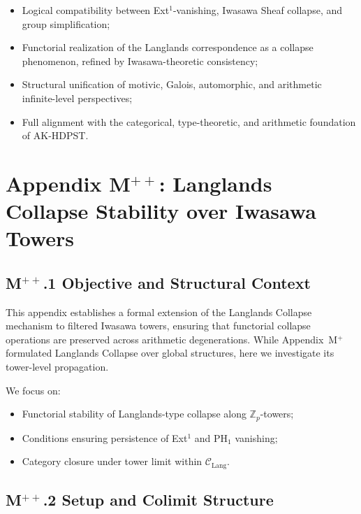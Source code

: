 \documentclass[11pt]{article}
\begin{document}
\begin{itemize}
    \item Logical compatibility between Ext$^1$-vanishing, Iwasawa Sheaf collapse, and group simplification;
    \item Functorial realization of the Langlands correspondence as a collapse phenomenon, refined by Iwasawa-theoretic consistency;
    \item Structural unification of motivic, Galois, automorphic, and arithmetic infinite-level perspectives;
    \item Full alignment with the categorical, type-theoretic, and arithmetic foundation of AK-HDPST.
\end{itemize}




\section*{Appendix M$^{++}$: Langlands Collapse Stability over Iwasawa Towers}

\subsection*{M$^{++}$.1 Objective and Structural Context}

This appendix establishes a formal extension of the Langlands Collapse mechanism to filtered Iwasawa towers, ensuring that functorial collapse operations are preserved across arithmetic degenerations. While Appendix~M$^+$ formulated Langlands Collapse over global structures, here we investigate its tower-level propagation.

We focus on:
\begin{itemize}
    \item Functorial stability of Langlands-type collapse along $\mathbb{Z}_p$-towers;
    \item Conditions ensuring persistence of Ext$^1$ and $\mathrm{PH}_1$ vanishing;
    \item Category closure under tower limit within $\mathcal{C}_{\mathrm{Lang}}$.
\end{itemize}

\subsection*{M$^{++}$.2 Setup and Colimit Structure}
\end{document}
